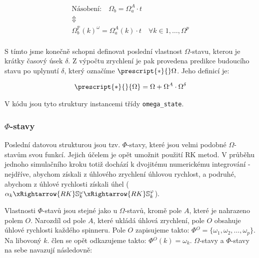 \begin{equation}
    \label{eq:sim_equations_formalized4}
    \begin{gathered}
        \text{Násobení:}\quad
        \Omega_{b} = \Omega_{a}^A \cdot t \quad \quad \\
        \Updownarrow \\
        \Omega_{b}^{\mathbb{P}}(k)^{\omega} = \Omega_{a}^{A}(k) \cdot t
        \quad \forall k \in {1, \ldots, \Omega^{p}} \\
    \end{gathered}
\end{equation}

S tímto jsme konečně schopni definovat poslední vlastnost $\Omega$-stavu, kterou je krátky časový úsek $\delta$.
Z výpočtu zrychlení je pak provedena predikce budoucího stavu po uplynutí $\delta$, který označíme $\prescript{*}{}\Omega$.
Jeho definicí je:

\begin{equation}
    \label{eq:sim_equations_formalized5}
    \begin{gathered}
        \prescript{*}{}{\Omega} = \Omega + \Omega^A \cdot \Omega^{\delta}
    \end{gathered}
\end{equation}

V kódu jsou tyto struktury instancemi třídy \texttt{omega\_state}.

\clearpage

\subsubsection{$\Phi$-stavy}

Poslední datovou strukturou jsou tzv. $\Phi$-stavy, které jsou velmi podobné $\Omega$-stavům svou funkcí. Jejich účelem je opět umožnit použití RK metod. V průběhu jednoho simulačního kroku totiž dochází k dvojitému numerickému integrování - nejdříve, abychom získali z úhlového zrychlení úhlovou rychlost, a podruhé, abychom z úhlové rychlosti získali úhel
($\alpha_k \xRightarrow{RK} \mathbb{S}_k^{\omega}  \xRightarrow{RK} \mathbb{S}_k^{\varphi}$).

Vlastnosti $\Phi$-stavů jsou stejné jako u $\Omega$-stavů, kromě pole $A$, které je nahrazeno polem $O$. Narozdíl od pole $A$, které ukládá úhlová zrychlení, pole $O$ obsahuje úhlové rychlosti každého spinneru. Pole $O$ zapisujeme takto: $\Phi{}^{O} = \{ \omega_1, \omega_2, \ldots, \omega_p\}$. Na libovoný $k$. člen se opět odkazujeme takto: $\Phi{}^{O}(k) = \omega_k$. $\Omega$-stavy a $\Phi$-stavy na sebe navazují následovně:

